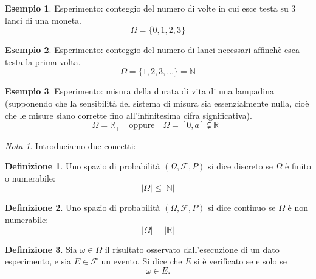 \documentclass{article}
\theoremstyle{plain}
\theoremstyle{definition}
\newtheorem{definizione}{Definizione}[section]
\newtheorem{esempio}{Esempio}[section]
\theoremstyle{remark}
\newtheorem*{nota}{Nota}
\begin{document}
\begin{esempio}
	Esperimento: conteggio del numero di volte in cui esce testa su 3 lanci di una moneta.
	\begin{equation*}
		\Omega=\{0,1,2,3\}
	\end{equation*}
\end{esempio}
\begin{esempio}
	Esperimento: conteggio del numero di lanci necessari affinchè esca testa la prima volta.
	\begin{equation*}
		\Omega=\{1,2,3,...\}=\mathbb{N}
	\end{equation*}
\end{esempio}
\begin{esempio}
	Esperimento: misura della durata di vita di una lampadina (supponendo che la sensibilità del sistema di misura sia essenzialmente nulla, cioè che le misure siano corrette fino all'infinitesima cifra significativa).
	\begin{equation*}
		\Omega=\mathds{R}_+\quad\text{oppure}\quad\Omega=[0,a]\subsetneqq\mathds{R}_+
	\end{equation*}
\end{esempio}
\begin{nota}
	Introduciamo due concetti:
	\begin{definizione}
		Uno spazio di probabilità $(\Omega,\mathscr{F},P)$ si dice discreto se $\Omega$ è finito o numerabile:
		\begin{equation*}
			\lvert\Omega\rvert\leq\lvert\mathbb{N}\rvert
		\end{equation*}
	\end{definizione}
	\begin{definizione}
		Uno spazio di probabilità $(\Omega,\mathscr{F},P)$ si dice continuo se $\Omega$ è non numerabile:
		\begin{equation*}
			\lvert\Omega\rvert=\lvert\mathds{R}\rvert
		\end{equation*}
	\end{definizione}
\end{nota}
\begin{definizione}
	Sia $\omega\in\Omega$ il risultato osservato dall'esecuzione di un dato esperimento, e sia $E\in\mathscr{F}$ un evento. Si dice che $E$ si è verificato se e solo se 
	\begin{equation*}
		\omega\in E\text{.}
	\end{equation*}
\end{definizione}
\end{document}
